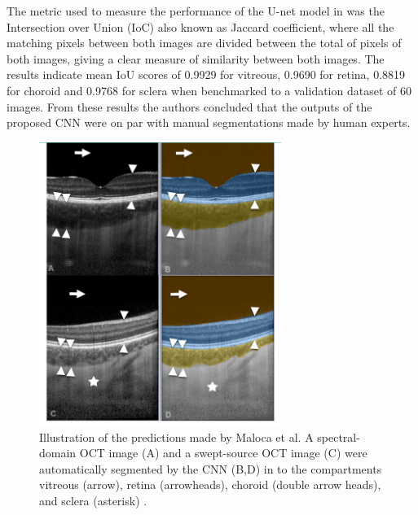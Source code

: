 \documentclass[12pt,a4paper]{scrartcl}
\begin{document}
The metric used to measure the performance of the U-net model in \cite{Maloca2019} was the Intersection over Union (IoC) also known as Jaccard coefficient, where all the matching pixels between both images are divided between the total of pixels of both images, giving a clear measure of similarity between both images. The results indicate mean IoU scores of 0.9929 for vitreous, 0.9690 for retina, 0.8819 for choroid and 0.9768 for sclera when benchmarked to a validation dataset of 60 images. From these results the authors concluded that the outputs of the proposed CNN were on par with manual segmentations made by human experts.

\begin{figure}[H]
    \centering
    \includegraphics[width=0.7\textwidth]{./images/maloca-segmentations-results.png}
    \caption{Illustration of the predictions made by Maloca et al. A spectral-domain OCT image (A) and a swept-source OCT image (C) were automatically segmented by the CNN (B,D) in to the compartments vitreous (arrow), retina (arrowheads), choroid (double arrow heads), and sclera (asterisk) \cite{Maloca2019}.}
\end{figure}
\end{document}

